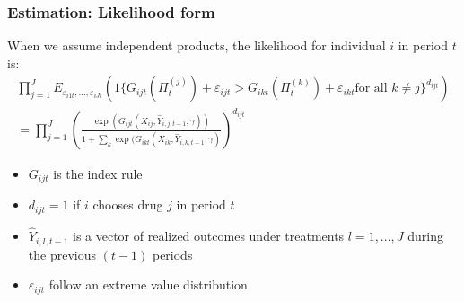 \documentclass[xcolor=pdftex,dvipsnames,table,mathserif,aspectratio=169]{beamer}
\begin{document}

\begin{frame}[label=ESTIMATION]

\frametitle{Estimation: Likelihood form}

When we assume independent products, the likelihood for individual $i$ in
period $t$ is:%
\begin{multline*}
\prod_{j=1}^{J}E_{\varepsilon _{i1t},...,\varepsilon _{iJt}}(1\{G_{ijt}(\Pi
_{t}^{(j)})+\varepsilon_{ijt}>G_{ikt}(\Pi _{t}^{(k)})+\varepsilon_{ikt}\text{
for all }k\neq j\}^{d_{ijt}}) \\
=\prod_{j=1}^{J}\left( \frac{\exp (G_{ijt}(X_{ij},\widehat{Y}%
_{i,j,t-1};\gamma ))}{1+\sum_{k}\exp (G_{ikt}(X_{ik},\widehat{Y}%
_{i,k,t-1};\gamma )}\right) ^{d_{ijt}}
\end{multline*}

\begin{itemize}
\item $G_{ijt}$ is the index rule

\item $d_{ijt}=1$ if $i$ chooses drug $j$ in period $t$

\item $\widehat{Y}_{i,l,t-1}$ is a vector of realized outcomes under
treatments $l=1,...,J$ during the previous $(t-1)$ periods

\item $\varepsilon _{ijt}$ follow an extreme value distribution
\end{itemize}
\end{frame}

\end{document}
